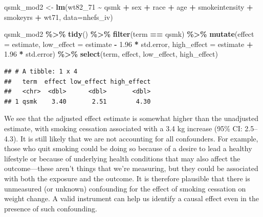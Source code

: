 \documentclass[
]{book}
\newenvironment{Shaded}{\begin{snugshade}}{\end{snugshade}}
\newcommand{\AttributeTok}[1]{\textcolor[rgb]{0.13,0.29,0.53}{#1}}
\newcommand{\FloatTok}[1]{\textcolor[rgb]{0.00,0.00,0.81}{#1}}
\newcommand{\FunctionTok}[1]{\textcolor[rgb]{0.13,0.29,0.53}{\textbf{#1}}}
\newcommand{\NormalTok}[1]{#1}
\newcommand{\OtherTok}[1]{\textcolor[rgb]{0.56,0.35,0.01}{#1}}
\newcommand{\SpecialCharTok}[1]{\textcolor[rgb]{0.81,0.36,0.00}{\textbf{#1}}}
\newcommand{\StringTok}[1]{\textcolor[rgb]{0.31,0.60,0.02}{#1}}
\begin{document}
\begin{Shaded}
\begin{Highlighting}[]
\NormalTok{qsmk\_mod2 }\OtherTok{\textless{}{-}} \FunctionTok{lm}\NormalTok{(wt82\_71 }\SpecialCharTok{\textasciitilde{}}\NormalTok{ qsmk }\SpecialCharTok{+}\NormalTok{ sex }\SpecialCharTok{+}\NormalTok{ race }\SpecialCharTok{+}\NormalTok{ age }\SpecialCharTok{+} 
\NormalTok{                  smokeintensity }\SpecialCharTok{+}\NormalTok{ smokeyrs }\SpecialCharTok{+}\NormalTok{ wt71, }
                \AttributeTok{data=}\NormalTok{nhefs\_iv)}

\NormalTok{qsmk\_mod2 }\SpecialCharTok{\%\textgreater{}\%} 
  \FunctionTok{tidy}\NormalTok{() }\SpecialCharTok{\%\textgreater{}\%} 
  \FunctionTok{filter}\NormalTok{(term }\SpecialCharTok{==} \StringTok{\textquotesingle{}qsmk\textquotesingle{}}\NormalTok{) }\SpecialCharTok{\%\textgreater{}\%}
  \FunctionTok{mutate}\NormalTok{(}\AttributeTok{effect =}\NormalTok{ estimate,}
         \AttributeTok{low\_effect =}\NormalTok{ estimate }\SpecialCharTok{{-}} \FloatTok{1.96} \SpecialCharTok{*}\NormalTok{ std.error, }
         \AttributeTok{high\_effect =}\NormalTok{ estimate }\SpecialCharTok{+} \FloatTok{1.96} \SpecialCharTok{*}\NormalTok{ std.error) }\SpecialCharTok{\%\textgreater{}\%} 
  \FunctionTok{select}\NormalTok{(term, effect, low\_effect, high\_effect)}
\end{Highlighting}
\end{Shaded}

\begin{verbatim}
## # A tibble: 1 x 4
##   term  effect low_effect high_effect
##   <chr>  <dbl>      <dbl>       <dbl>
## 1 qsmk    3.40       2.51        4.30
\end{verbatim}

We see that the adjusted effect estimate is somewhat higher than the unadjusted estimate, with smoking cessation associated with a 3.4 kg increase (95\% CI: 2.5--4.3). It is still likely that we are not accounting for all confounders. For example, those who quit smoking could be doing so because of a desire to lead a healthy lifestyle or because of underlying health conditions that may also affect the outcome---these aren't things that we're measuring, but they could be associated with both the exposure and the outcome. It is therefore plausible that there is unmeasured (or unknown) confounding for the effect of smoking cessation on weight change. A valid instrument can help us identify a causal effect even in the presence of such confounding.
\end{document}
